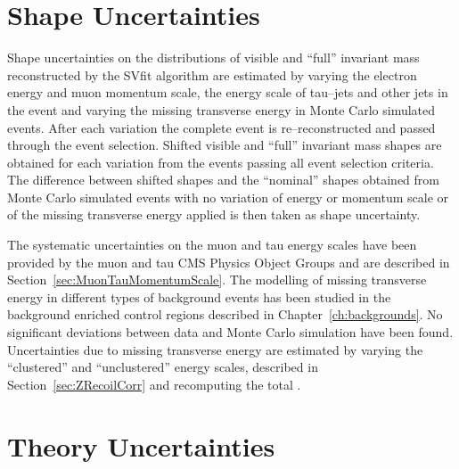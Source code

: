 \section{Shape Uncertainties}
\label{sec:ShapeUncertainties}
%
Shape uncertainties on the distributions of visible and ``full'' invariant mass
reconstructed by the SVfit algorithm are estimated by varying the electron
energy and muon momentum scale, the energy scale of tau--jets and other jets in
the event and varying the missing transverse energy in Monte Carlo simulated
events.  After each variation the complete event is re--reconstructed and passed
through the event selection.  Shifted visible and ``full'' invariant mass shapes
are obtained for each variation from the events passing all event selection
criteria.  The difference between shifted shapes and the ``nominal'' shapes
obtained from Monte Carlo simulated events with no variation of energy or
momentum scale or of the missing transverse energy applied is then taken as
shape uncertainty.

The systematic uncertainties on the muon and tau energy scales have been
provided by the muon and tau CMS Physics Object Groups and are described in
Section~\ref{sec:MuonTauMomentumScale}.  The modelling of missing transverse
energy in different types of background events has been studied in the
background enriched control regions described in Chapter~\ref{ch:backgrounds}.
No significant deviations between data and Monte Carlo simulation have been
found.  
Uncertainties due to missing transverse energy are estimated by varying
the ``clustered'' and ``unclustered'' energy scales, described in
Section~\ref{sec:ZRecoilCorr} and recomputing the total \MET.

\section{Theory Uncertainties}

